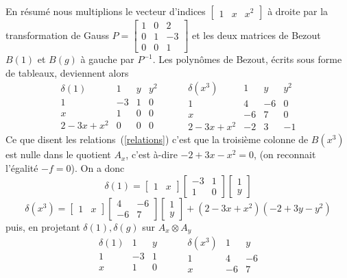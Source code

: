 \documentclass{standalone}
\begin{document}
En résumé nous multiplions le vecteur d'indices
$\begin{bmatrix}
	1 & x & x^2
\end{bmatrix}$ à droite par la transformation de Gauss
$P =
\begin{bmatrix}
	1 & 0 & 2 \\
	0 & 1 & -3 \\
	0 & 0 & 1
\end{bmatrix}$
et les deux matrices de Bezout $B(1)$ et $B(g)$ à gauche par $P^{-1}$. Les polynômes de Bezout, écrits sous forme de tableaux, deviennent alors
$$
\begin{array}{c|ccc}
	\delta(1) & 1 & y & y^2\\
	\hline
	1 & -3 & 1 & 0\\
	x & 1 & 0 & 0\\
	2 - 3x + x^2 & 0 & 0 & 0
\end{array}
\hspace{1cm}
\begin{array}{c|ccc}
	\delta(x^3) & 1 & y & y^2\\
	\hline
	1 & 4 & -6 & 0 \\
	x & -6 & 7 & 0 \\
	2 - 3x + x^2 & -2 & 3 & -1
\end{array}
$$
Ce que disent les relations~(\ref{relations}) c'est que la troisième colonne de $B(x^3)$ est nulle dans le quotient $A_x$, c'est à-dire $-2 + 3x - x^2 = 0$, (on reconnait l'égalité $-f = 0$). On a donc
$$
\delta(1) = \begin{bmatrix}
	1 & x
\end{bmatrix}
\begin{bmatrix}
	-3 & 1 \\
	1 & 0
\end{bmatrix}
\begin{bmatrix}
	1 \\
	y
\end{bmatrix}$$
$$\delta(x^3) = \begin{bmatrix}
	1 & x
\end{bmatrix}
\begin{bmatrix}
	4 & -6 \\
	-6 & 7
\end{bmatrix}
\begin{bmatrix}
	1 \\
	y
\end{bmatrix} + (2 - 3x + x^2)(-2 + 3y - y^2)$$
puis, en projetant $\delta(1), \delta(g)$ sur $A_x \otimes A_y$
$$
\begin{array}{c|cc}
	\delta(1) & 1 & y \\
	\hline
	1 & -3 & 1 \\
	x & 1 & 0
\end{array}
\hspace{1cm}
\begin{array}{c|cc}
	\delta(x^3) & 1 & y \\
	\hline
	1 & 4 & -6  \\
	x & -6 & 7
\end{array}
$$
\end{document}
